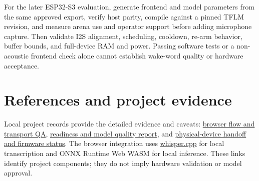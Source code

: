 \documentclass[11pt]{article}
\begin{document}
For the later ESP32-S3 evaluation, generate frontend and model parameters from the same approved export, verify host parity, compile against a pinned TFLM revision, and measure arena use and operator support before adding microphone capture. Then validate I2S alignment, scheduling, cooldown, re-arm behavior, buffer bounds, and full-device RAM and power. Passing software tests or a non-acoustic frontend check alone cannot establish wake-word quality or hardware acceptance.
\section{References and project evidence}
Local project records provide the detailed evidence and caveats: \href{../research/voice-flow-qa.md}{browser flow and transport QA}, \href{../research/voice-final-readiness.md}{readiness and model quality report}, and \href{../firmware/README.md}{physical-device handoff and firmware status}. The browser integration uses \href{https://github.com/ggerganov/whisper.cpp}{whisper.cpp} for local transcription and ONNX Runtime Web WASM for local inference. These links identify project components; they do not imply hardware validation or model approval.
\end{document}
